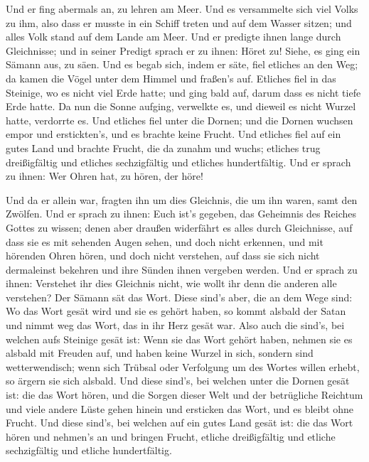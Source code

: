  Und er fing abermals an, zu lehren am Meer. Und es
versammelte sich viel Volks zu ihm, also dass er musste in ein Schiff
treten und auf dem Wasser sitzen; und alles Volk stand auf dem Lande am
Meer.  Und er predigte ihnen lange durch Gleichnisse; und
in seiner Predigt sprach er zu ihnen:  Höret zu! Siehe, es
ging ein Sämann aus, zu säen.  Und es begab sich, indem er
säte, fiel etliches an den Weg; da kamen die Vögel unter dem Himmel und
fraßen's auf.  Etliches fiel in das Steinige, wo es nicht
viel Erde hatte; und ging bald auf, darum dass es nicht tiefe Erde
hatte.  Da nun die Sonne aufging, verwelkte es, und
dieweil es nicht Wurzel hatte, verdorrte es.  Und etliches
fiel unter die Dornen; und die Dornen wuchsen empor und erstickten's,
und es brachte keine Frucht.  Und etliches fiel auf ein
gutes Land und brachte Frucht, die da zunahm und wuchs; etliches trug
dreißigfältig und etliches sechzigfältig und etliches hundertfältig.
 Und er sprach zu ihnen: Wer Ohren hat, zu hören, der
höre!

 Und da er allein war, fragten ihn um dies Gleichnis, die
um ihn waren, samt den Zwölfen.  Und er sprach zu ihnen:
Euch ist's gegeben, das Geheimnis des Reiches Gottes zu wissen; denen
aber draußen widerfährt es alles durch Gleichnisse,  auf
dass sie es mit sehenden Augen sehen, und doch nicht erkennen, und mit
hörenden Ohren hören, und doch nicht verstehen, auf dass sie sich nicht
dermaleinst bekehren und ihre Sünden ihnen vergeben werden.
 Und er sprach zu ihnen: Verstehet ihr dies Gleichnis
nicht, wie wollt ihr denn die anderen alle verstehen? 
Der Sämann sät das Wort.  Diese sind's aber, die an dem
Wege sind: Wo das Wort gesät wird und sie es gehört haben, so kommt
alsbald der Satan und nimmt weg das Wort, das in ihr Herz gesät war.
 Also auch die sind's, bei welchen aufs Steinige gesät
ist: Wenn sie das Wort gehört haben, nehmen sie es alsbald mit Freuden
auf,  und haben keine Wurzel in sich, sondern sind
wetterwendisch; wenn sich Trübsal oder Verfolgung um des Wortes willen
erhebt, so ärgern sie sich alsbald.  Und diese sind's,
bei welchen unter die Dornen gesät ist: die das Wort hören,
 und die Sorgen dieser Welt und der betrügliche Reichtum
und viele andere Lüste gehen hinein und ersticken das Wort, und es
bleibt ohne Frucht.  Und diese sind's, bei welchen auf
ein gutes Land gesät ist: die das Wort hören und nehmen's an und bringen
Frucht, etliche dreißigfältig und etliche sechzigfältig und etliche
hundertfältig.

